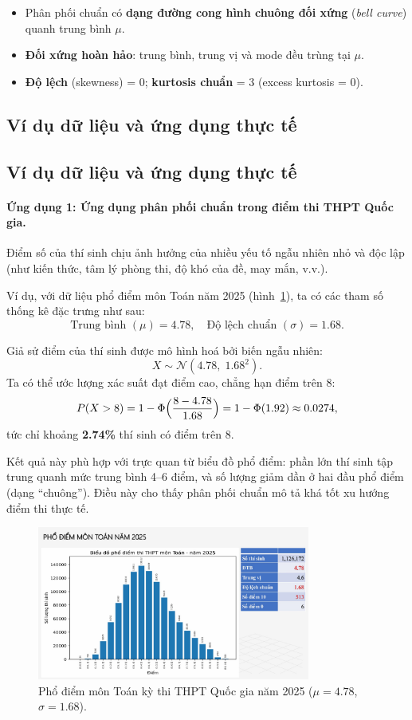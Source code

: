 \begin{itemize}
    \item Phân phối chuẩn có \textbf{dạng đường cong hình chuông đối xứng} (\textit{bell curve}) quanh trung bình $\mu$.
    \item \textbf{Đối xứng hoàn hảo}: trung bình, trung vị và mode đều trùng tại $\mu$.
    \item \textbf{Độ lệch} (skewness) = 0; \textbf{kurtosis chuẩn} = 3 (excess kurtosis = 0).
\end{itemize}

\subsection*{Ví dụ dữ liệu và ứng dụng thực tế }

\subsection{Ví dụ dữ liệu và ứng dụng thực tế }

\paragraph{Ứng dụng 1: Ứng dụng phân phối chuẩn trong điểm thi THPT Quốc gia.}   
Điểm số của thí sinh chịu ảnh hưởng của nhiều yếu tố ngẫu nhiên nhỏ và độc lập 
(như kiến thức, tâm lý phòng thi, độ khó của đề, may mắn, v.v.).

Ví dụ, với dữ liệu phổ điểm môn Toán năm 2025 (hình~\ref{fig:thpt2025}), 
ta có các tham số thống kê đặc trưng như sau:
\[
\text{Trung bình } (\mu) = 4.78, \quad 
\text{Độ lệch chuẩn } (\sigma) = 1.68.
\]

Giả sử điểm của thí sinh được mô hình hoá bởi biến ngẫu nhiên:
\[
X \sim \mathcal{N}(4.78,\;1.68^2).
\]
Ta có thể ước lượng xác suất đạt điểm cao, chẳng hạn điểm trên 8:
\[
P(X > 8) = 1 - \Phi\Bigl(\frac{8 - 4.78}{1.68}\Bigr)
= 1 - \Phi(1.92) \approx 0.0274,
\]
tức chỉ khoảng \textbf{2.74\%} thí sinh có điểm trên 8.

Kết quả này phù hợp với trực quan từ biểu đồ phổ điểm: 
phần lớn thí sinh tập trung quanh mức trung bình 4--6 điểm, 
và số lượng giảm dần ở hai đầu phổ điểm (dạng “chuông”).  
Điều này cho thấy phân phối chuẩn mô tả khá tốt xu hướng điểm thi thực tế.

\begin{figure}[h!]
    \centering
    \includegraphics[width=0.8\textwidth]{images/PhodiemToan2025.png}
    \caption{Phổ điểm môn Toán kỳ thi THPT Quốc gia năm 2025 ($\mu = 4.78$, $\sigma = 1.68$).}
    \label{fig:thpt2025}
\end{figure}

